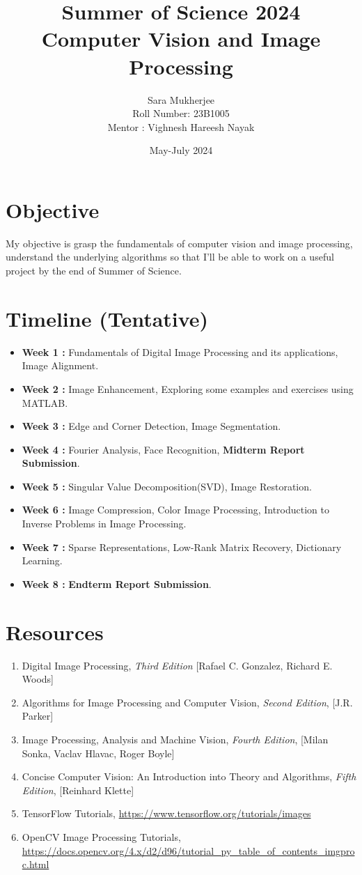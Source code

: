 \documentclass{article}
\title{\textbf{Summer of Science 2024} \\ Computer Vision and Image Processing}
\date{May-July 2024}
\author{Sara Mukherjee\\ Roll Number: 23B1005\\ 
Mentor : Vighnesh Hareesh Nayak }
\begin{document}
\maketitle
\section*{Objective}
My objective is grasp the fundamentals of computer vision and image processing, understand the underlying algorithms so that I'll be able to work on a useful project by the end of Summer of Science.
\section*{Timeline (Tentative)}
\begin{itemize}
    \item \textbf{Week 1 : }  Fundamentals of Digital Image Processing and its applications, Image Alignment.
    \item \textbf{Week 2 : } Image Enhancement, Exploring some examples and exercises using MATLAB.
    \item \textbf{Week 3 : } Edge and Corner Detection, Image Segmentation.
    \item \textbf{Week 4 : } Fourier Analysis, Face Recognition, \textbf{Midterm Report Submission}.
    \item \textbf{Week 5 : } Singular Value Decomposition(SVD), Image Restoration.
    \item \textbf{Week 6 : }Image Compression, Color Image Processing, Introduction to Inverse Problems in Image Processing.
    \item \textbf{Week 7 : } Sparse Representations, Low-Rank Matrix Recovery, Dictionary Learning.
    \item \textbf{Week 8 : } \textbf{Endterm Report Submission}.
\end{itemize}
\section*{Resources}
\begin{enumerate}
    \item Digital Image Processing, \textit{Third Edition} [Rafael C. Gonzalez, Richard E. Woods]
    \item Algorithms for Image Processing and Computer Vision, \textit{Second Edition}, [J.R. Parker]
    \item Image Processing, Analysis and Machine Vision, \textit{Fourth Edition}, [Milan Sonka, Vaclav Hlavac, Roger Boyle]
    \item Concise Computer Vision: An Introduction into Theory and Algorithms, \textit{Fifth Edition}, [Reinhard Klette]
    \item TensorFlow Tutorials, 
    \url{https://www.tensorflow.org/tutorials/images}
    \item OpenCV Image Processing Tutorials, \url{https://docs.opencv.org/4.x/d2/d96/tutorial_py_table_of_contents_imgproc.html}
\end{enumerate}
\end{document}
